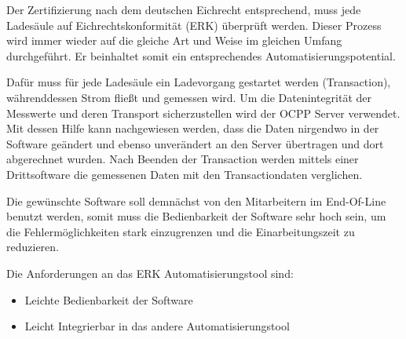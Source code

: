 Der Zertifizierung nach dem deutschen Eichrecht entsprechend, muss jede Ladesäule auf Eichrechtskonformität (ERK) überprüft werden.
Dieser Prozess wird immer wieder auf die gleiche Art und Weise im gleichen Umfang durchgeführt. 
Er beinhaltet somit ein entsprechendes Automatisierungspotential.

Dafür muss für jede Ladesäule ein Ladevorgang gestartet werden (Transaction), währenddessen Strom fließt und gemessen wird.   
Um die Datenintegrität der Messwerte und deren Transport sicherzustellen wird der OCPP Server verwendet. 
Mit dessen Hilfe kann nachgewiesen werden, 
dass die Daten nirgendwo in der Software geändert und ebenso unverändert an den Server übertragen und dort abgerechnet wurden. 
Nach Beenden der Transaction werden mittels einer Drittsoftware die gemessenen Daten mit den Transactiondaten verglichen.

Die gewünschte Software soll demnächst von den Mitarbeitern im End-Of-Line benutzt werden, somit muss die Bedienbarkeit der Software sehr hoch sein,
um die Fehlermöglichkeiten stark einzugrenzen und die Einarbeitungszeit zu reduzieren.

Die Anforderungen an das ERK Automatisierungstool sind:
\begin{itemize}
    \item Leichte Bedienbarkeit der Software
    \item Leicht Integrierbar in das andere Automatisierungstool
\end{itemize}
